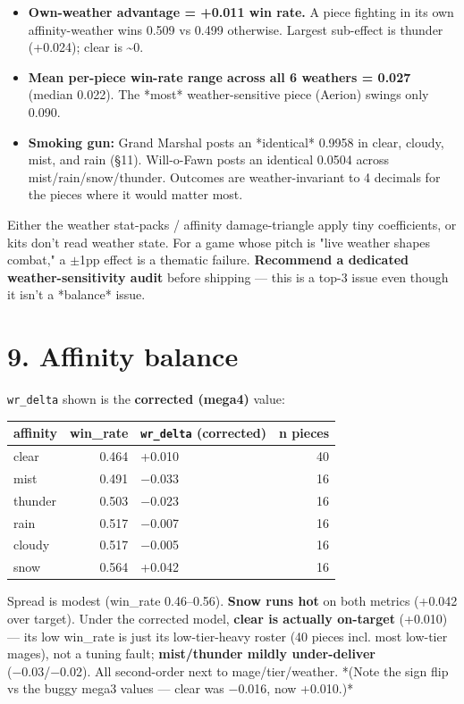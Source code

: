 \documentclass[10pt]{article}
\begin{document}
\begin{itemize}
\item \textbf{Own-weather advantage = +0.011 win rate.} A piece fighting in its own affinity-weather wins 0.509 vs 0.499 otherwise. Largest sub-effect is thunder (+0.024); clear is \textasciitilde{}0.
\item \textbf{Mean per-piece win-rate range across all 6 weathers = 0.027} (median 0.022). The *most* weather-sensitive piece (Aerion) swings only 0.090.
\item \textbf{Smoking gun:} Grand Marshal posts an *identical* 0.9958 in clear, cloudy, mist, and rain (\S{}11). Will-o-Fawn posts an identical 0.0504 across mist/rain/snow/thunder. Outcomes are weather-invariant to 4 decimals for the pieces where it would matter most.
\end{itemize}

Either the weather stat-packs / affinity damage-triangle apply tiny coefficients, or kits don't read weather state. For a game whose pitch is "live weather shapes combat," a $\pm$1pp effect is a thematic failure. \textbf{Recommend a dedicated weather-sensitivity audit} before shipping --- this is a top-3 issue even though it isn't a *balance* issue.\\


\section*{9. Affinity balance}

\texttt{wr\_\allowbreak{}delta} shown is the \textbf{corrected (mega4)} value:\\

\medskip
\begin{tabularx}{\linewidth}{LrLr}
\toprule
\textbf{affinity} & \textbf{win\_rate} & \textbf{\texttt{wr\_\allowbreak{}delta} (corrected)} & \textbf{n pieces} \\
\midrule
clear & 0.464 & +0.010 & 40 \\
mist & 0.491 & −0.033 & 16 \\
thunder & 0.503 & −0.023 & 16 \\
rain & 0.517 & −0.007 & 16 \\
cloudy & 0.517 & −0.005 & 16 \\
snow & 0.564 & +0.042 & 16 \\
\bottomrule
\end{tabularx}
\medskip

Spread is modest (win\_rate 0.46--0.56). \textbf{Snow runs hot} on both metrics (+0.042 over target). Under the corrected model, \textbf{clear is actually on-target} (+0.010) --- its low win\_rate is just its low-tier-heavy roster (40 pieces incl. most low-tier mages), not a tuning fault; \textbf{mist/thunder mildly under-deliver} (−0.03/−0.02). All second-order next to mage/tier/weather. *(Note the sign flip vs the buggy mega3 values --- clear was −0.016, now +0.010.)*\\
\end{document}
